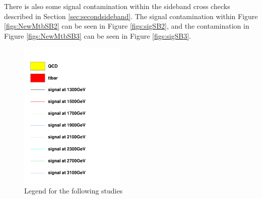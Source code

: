 There is also some signal contamination within the sideband cross checks described in Section \ref{sec:secondsideband}.  The signal contamination within Figure \ref{figs:NewMtbSB2} can be seen in Figure \ref{figs:sigSB2}, 
and the contamination in Figure \ref{figs:NewMtbSB3} can be seen in Figure \ref{figs:sigSB3}. 

\begin{figure}[Htcb]
\centering
\includegraphics[width=0.45\textwidth]{figs/legend.pdf}
\caption{Legend for the following studies}
\label{figs:legend}
\end{figure}

